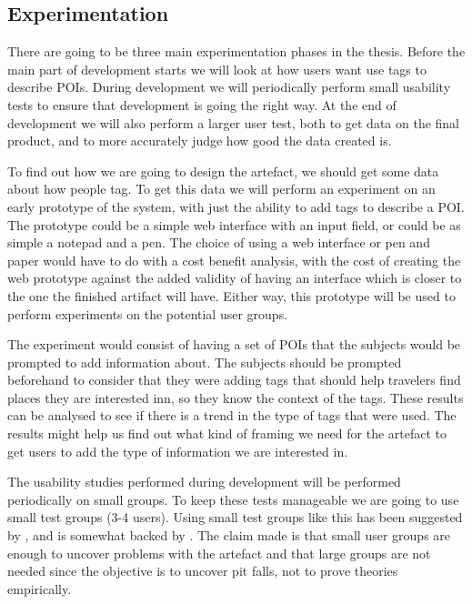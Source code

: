 \subsection{Experimentation}
There are going to be three main experimentation phases in the thesis.
Before the main part of development starts we will look at how users want use tags to describe POIs.
During development we will periodically perform small usability tests to ensure that development is going the right way.
At the end of development we will also perform a larger user test, both to get data on the final product, and to more accurately judge how good the data created is.

To find out how we are going to design the artefact, we should get some data about how people tag.
To get this data we will perform an experiment on an early prototype of the system, with just the ability to add tags to describe a POI. 
The prototype could be a simple web interface with an input field, or could be as simple a notepad and a pen.
The choice of using a web interface or pen and paper would have to do with a cost benefit analysis, 
with the cost of creating the web prototype against the added validity of having an interface which is closer to the one the finished artifact will have.
Either way, this prototype will be used to perform experiments on the potential user groups. 

The experiment would consist of having a set of POIs that the subjects would be prompted to add information about. 
The subjects should be prompted beforehand to consider that they were adding tags that should help travelers find places they are interested inn, so they know the context of the tags.
These results can be analysed to see if there is a trend in the type of tags that were used. 
The results might help us find out what kind of framing we need for the artefact to get users to add the type of information we are interested in.

The usability studies performed during development will be performed periodically on small groups.
To keep these tests manageable we are going to use small test groups (3-4 users).
Using small test groups like this has been suggested by \citet{Nilsen2000}, and is somewhat backed by \citet{Bevan2003}. 
The claim made is that small user groups are enough to uncover problems with the artefact and that large groups are not needed
since the objective is to uncover pit falls, not to prove theories empirically.


